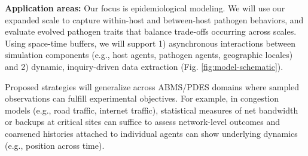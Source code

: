 





% 
\vspace{.5em}

\noindent\textbf{Application areas:} Our focus is epidemiological modeling.
We will use our expanded scale to capture within-host and between-host pathogen behaviors, and evaluate evolved pathogen traits that balance trade-offs occurring across scales.
Using space-time buffers, we will support 1) asynchronous interactions between simulation components (e.g., host agents, pathogen agents, geographic locales) and 2) dynamic, inquiry-driven data extraction (Fig. \ref{fig:model-schematic}).

Proposed strategies will generalize across ABMS/PDES domains where sampled observations can fulfill experimental objectives.
For example, in congestion models (e.g., road traffic, internet traffic), statistical measures of net bandwidth or backups at critical sites can suffice to assess network-level outcomes and coarsened histories attached to individual agents can show underlying dynamics (e.g., position across time).
%